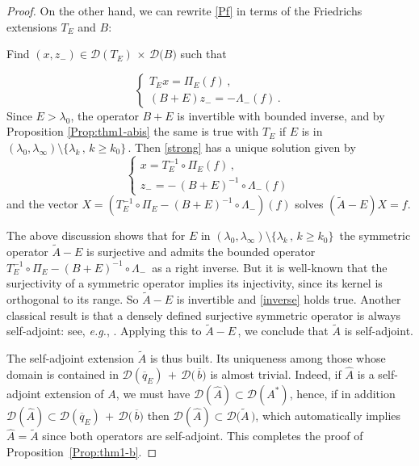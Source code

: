 \documentclass[12pt,reqno]{amsart}
\renewcommand{\(}{\left(}
\renewcommand{\)}{\right)}
\begin{document}
\begin{proof}
\noindent
On the other hand, we can rewrite \eqref{Pf} in terms of the Friedrichs extensions $T_E$ and $B$:\\[4pt]
{\it \centerline{Find $(x, z_-) \in \mathcal D(T_E)\,\times\, \mathcal D\big(B\big)$ such that}}
\begin{equation}
\left\{\begin{array}{ll}
T_E x=\Pi_E(f)\,,\\
(B+E)z_-=-\Lambda_-(f)\,.
\end{array} \label{strong}\right.
\end{equation}
Since $E>\lambda_0$, the operator $B+E$ is invertible with bounded inverse, and by Proposition \ref{Prop:thm1-abis} the same is true with $T_E$ if $E$ is in $(\lambda_0,\lambda_\infty)\setminus\{\lambda_k\,,\,k\geq k_0\}\,$. Then \eqref{strong} has a unique solution given by
\begin{equation}
\left\{\begin{array}{ll}
x=T_E^{-1}\circ \Pi_E(f)\,,\\
z_-=-\,(B+E)^{-1}\circ \Lambda_-(f)\,
\end{array}\label{inversion} \right.
\end{equation}
and the vector $X=\left(T_E^{-1}\circ \Pi_E-(B+E)^{-1}\circ \Lambda_-\right)(f)$ solves $(\widetilde A-E)X=f$.

\noindent
The above discussion shows that for $E$ in $(\lambda_0,\lambda_\infty)\setminus\{\lambda_k\,,\,k\geq k_0\}\,$ the symmetric operator $\widetilde A-E$ is surjective and admits the bounded operator $T_E^{-1}\circ \Pi_E-(B+E)^{-1}\circ \Lambda_-\,$ as a right inverse. But it is well-known that the surjectivity of a symmetric operator implies its injectivity, since its kernel is orthogonal to its range. So $\widetilde A-E$ is invertible and \eqref{inverse} holds true. Another classical result is that a densely defined surjective symmetric operator is always self-adjoint: see, {\it e.g.}, \cite[Corollary 3.12]{schmudgen2012unbounded}. Applying this to $\widetilde A -E\,$, we conclude that $\widetilde A$ is self-adjoint.

The self-adjoint extension $\widetilde A$ is thus built. Its uniqueness among those whose domain is contained in $\mathcal D(\overline{q}_E)\,+\, \mathcal D\big(\,\overline{b}\big)$ is almost trivial. Indeed, if $\hat{A}$ is a self-adjoint extension of $A$, we must have $\mathcal D(\hat{A}) \subset \mathcal D(A^*)$, hence, if in addition $\mathcal D(\hat{A})\subset \mathcal D(\overline{q}_E)\,+\, \mathcal D\big(\,\overline{b}\big)$ then $\mathcal D(\hat{A})\subset \mathcal D\big(\widetilde A\,\big)$, which automatically implies $\hat{A} = \widetilde A$ since both operators are self-adjoint.
This completes the proof of Proposition~\ref{Prop:thm1-b}.
\end{proof}
\end{document}
